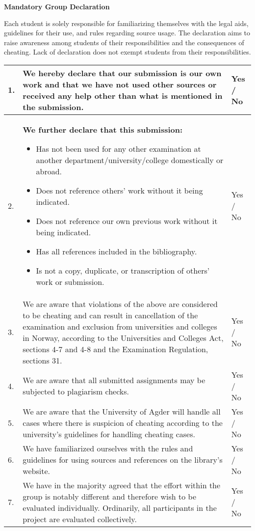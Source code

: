 

\large{\bf{Mandatory Group Declaration}}

{\small {}
Each student is solely responsible for familiarizing themselves with the legal aids, guidelines for their use, and rules regarding source usage. The declaration aims to raise awareness among students of their responsibilities and the consequences of cheating. Lack of declaration does not exempt students from their responsibilities.

\begin{center}
\begin{tabular}{ |p{0.2cm}|p{13.5cm}|p{1cm}|}
\hline

1.& We hereby declare that our submission is our own work and that we have not used other sources or received any help other than what is mentioned in the submission. & Yes / No \\
\hline
2. & \textbf{We further declare that this submission:}
\begin{itemize}
\item Has not been used for any other examination at another department/university/college domestically or abroad.
\item Does not reference others' work without it being indicated.
\item Does not reference our own previous work without it being indicated.
\item Has all references included in the bibliography.
\item Is not a copy, duplicate, or transcription of others' work or submission.
\end{itemize}& Yes / No \\
\hline
3. & We are aware that violations of the above are considered to be cheating and can result in cancellation of the examination and exclusion from universities and colleges in Norway, according to the Universities and Colleges Act, sections 4-7 and 4-8 and the Examination Regulation, sections 31.
 & Yes / No \\
\hline
4. & We are aware that all submitted assignments may be subjected to plagiarism checks.
& Yes / No \\
\hline
5. & We are aware that the University of Agder will handle all cases where there is suspicion of cheating according to the university's guidelines for handling cheating cases.
& Yes / No \\
\hline
6. & We have familiarized ourselves with the rules and guidelines for using sources and references on the library's website.
& Yes / No \\
\hline
7. & We have in the majority agreed that the effort within the group is notably different and therefore wish to be evaluated individually.
Ordinarily, all participants in the project are evaluated collectively.
& Yes / No \\
\hline
\end{tabular}
\end{center}
}

